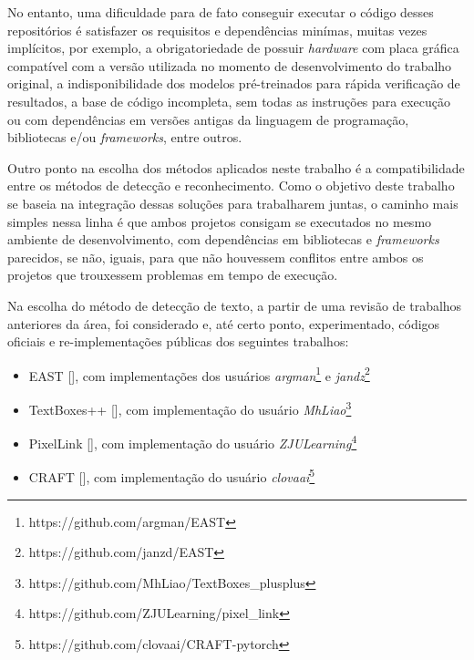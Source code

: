 No entanto, uma dificuldade para de fato conseguir executar o código desses repositórios é satisfazer os requisitos e dependências 
minímas, muitas vezes implícitos, por exemplo, a obrigatoriedade de possuir \textit{hardware} com placa gráfica compatível com a versão 
utilizada no momento de desenvolvimento do trabalho original, a indisponibilidade dos modelos pré-treinados para rápida verificação de 
resultados, a base de código incompleta, sem todas as instruções para execução ou com dependências em versões antigas da linguagem de 
programação, bibliotecas e/ou \textit{frameworks}, entre outros.

Outro ponto na escolha dos métodos aplicados neste trabalho é a compatibilidade entre os métodos de detecção e reconhecimento. 
Como o objetivo deste trabalho se baseia na integração dessas soluções para trabalharem juntas, o caminho mais simples nessa linha é 
que ambos projetos consigam se executados no mesmo ambiente de desenvolvimento, com dependências em bibliotecas e \textit{frameworks} parecidos, 
se não, iguais, para que não houvessem conflitos entre ambos os projetos que trouxessem problemas em tempo de execução.

Na escolha do método de detecção de texto, a partir de uma revisão de trabalhos anteriores da área, foi considerado e, até certo ponto, 
experimentado, códigos oficiais e re-implementações públicas dos seguintes trabalhos:

\begin{itemize}
    \item EAST [], com implementações dos usuários \textit{argman}\footnote{https://github.com/argman/EAST} e 
    \textit{jandz}\footnote{https://github.com/janzd/EAST}

    \item TextBoxes++ [], com implementação do usuário \textit{MhLiao}\footnote{https://github.com/MhLiao/TextBoxes\_plusplus}

    \item PixelLink [], com implementação do usuário \textit{ZJULearning}\footnote{https://github.com/ZJULearning/pixel\_link}

    \item CRAFT [], com implementação do usuário \textit{clovaai}\footnote{https://github.com/clovaai/CRAFT-pytorch}
\end{itemize}

